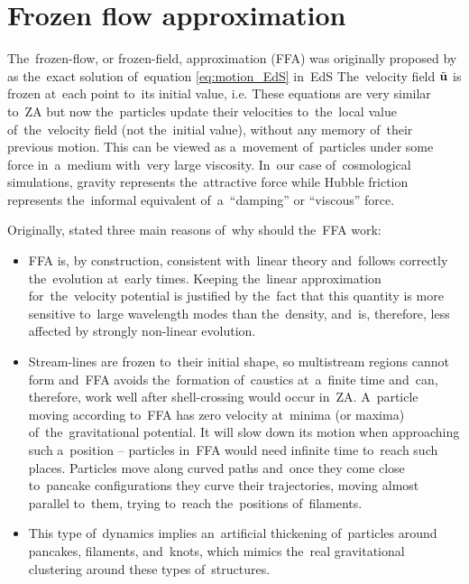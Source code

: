 \section{Frozen flow approximation}
The~frozen-flow, or frozen-field, approximation (FFA) was originally proposed by \textcite{Matarrese:1992be} as the~exact solution of~equation \eqref{eq:motion_EdS} in~EdS
The~velocity field $\tilde{\mathbf u}$ is frozen at~each point to~its initial value, i.e.
These equations are very similar to~ZA but now the~particles update their velocities to~the~local value of~the~velocity field (not the~initial value), without any memory of~their previous motion. This can be viewed as a~movement of~particles under some force in~a~medium with~very large viscosity. In~our case of~cosmological simulations, gravity represents the~attractive force while Hubble friction represents the~informal equivalent of~a~``damping'' or ``viscous'' force.

Originally, \textcite{Matarrese:1992be} stated three main reasons of~why should the~FFA work:
\begin{itemize}
\item FFA is, by construction, consistent with~linear theory and~follows correctly the~evolution at~early times. Keeping the~linear approximation for~the~velocity potential is justified by the~fact that this quantity is more sensitive to~large wavelength modes than the~density, and~is, therefore, less affected by strongly non-linear evolution.
\item Stream-lines are frozen to~their initial shape, so multistream regions cannot form and~FFA avoids the~formation of~caustics at~a~finite time and~can, therefore, work well after shell-crossing would occur in~ZA. A~particle moving according to~FFA has zero velocity at~minima (or maxima) of~the~gravitational potential. It will slow down its motion when approaching such a~position -- particles in~FFA would need infinite time to~reach such places. Particles move along curved paths and~once they come close to~pancake configurations they curve their trajectories, moving almost parallel to~them, trying to~reach the~positions of~filaments.
\item This type of~dynamics implies an~artificial thickening of~particles around pancakes, filaments, and~knots, which mimics the~real gravitational clustering around these types of~structures.
\end{itemize}

